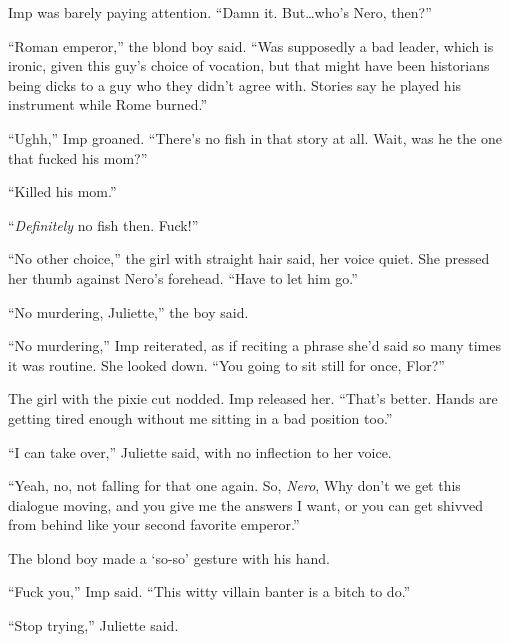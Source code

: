 Imp was barely paying attention.  ``Damn it.  But\ldots who's Nero, then?''



``Roman emperor,'' the blond boy said.  ``Was supposedly a bad leader, which is ironic, given this guy's choice of vocation, but that might have been historians being dicks to a guy who they didn't agree with.  Stories say he played his instrument while Rome burned.''



``Ughh,'' Imp groaned.  ``There's no fish in that story at all.  Wait, was he the one that fucked his mom?''



``Killed his mom.''



``\emph{Definitely} no fish then.  Fuck!''



``No other choice,'' the girl with straight hair said, her voice quiet.  She pressed her thumb against Nero's forehead.  ``Have to let him go.''



``No murdering, Juliette,'' the boy said.



``No murdering,'' Imp reiterated, as if reciting a phrase she'd said so many times it was routine.  She looked down.  ``You going to sit still for once, Flor?''



The girl with the pixie cut nodded.  Imp released her.  ``That's better.  Hands are getting tired enough without me sitting in a bad position too.''



``I can take over,'' Juliette said, with no inflection to her voice.



``Yeah, no, not falling for that one again.  So, \emph{Nero}, Why don't we get this dialogue moving, and you give me the answers I want, or you can get shivved from behind like your second favorite emperor.''



The blond boy made a `so-so' gesture with his hand.



``Fuck you,'' Imp said.  ``This witty villain banter is a bitch to do.''



``Stop trying,'' Juliette said.



